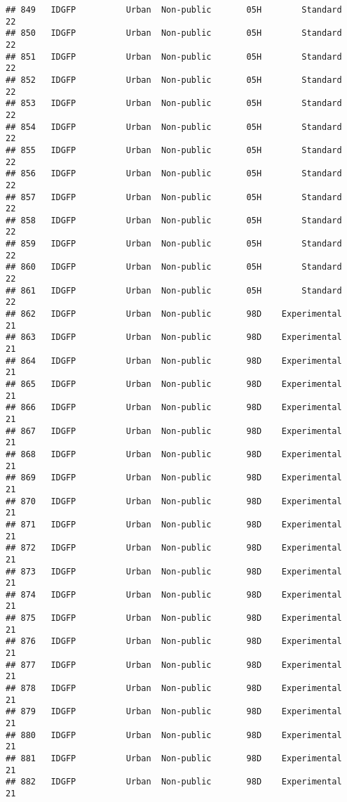 \documentclass[
]{article}
\begin{document}
\begin{verbatim}
## 849   IDGFP          Urban  Non-public       05H        Standard        22
## 850   IDGFP          Urban  Non-public       05H        Standard        22
## 851   IDGFP          Urban  Non-public       05H        Standard        22
## 852   IDGFP          Urban  Non-public       05H        Standard        22
## 853   IDGFP          Urban  Non-public       05H        Standard        22
## 854   IDGFP          Urban  Non-public       05H        Standard        22
## 855   IDGFP          Urban  Non-public       05H        Standard        22
## 856   IDGFP          Urban  Non-public       05H        Standard        22
## 857   IDGFP          Urban  Non-public       05H        Standard        22
## 858   IDGFP          Urban  Non-public       05H        Standard        22
## 859   IDGFP          Urban  Non-public       05H        Standard        22
## 860   IDGFP          Urban  Non-public       05H        Standard        22
## 861   IDGFP          Urban  Non-public       05H        Standard        22
## 862   IDGFP          Urban  Non-public       98D    Experimental        21
## 863   IDGFP          Urban  Non-public       98D    Experimental        21
## 864   IDGFP          Urban  Non-public       98D    Experimental        21
## 865   IDGFP          Urban  Non-public       98D    Experimental        21
## 866   IDGFP          Urban  Non-public       98D    Experimental        21
## 867   IDGFP          Urban  Non-public       98D    Experimental        21
## 868   IDGFP          Urban  Non-public       98D    Experimental        21
## 869   IDGFP          Urban  Non-public       98D    Experimental        21
## 870   IDGFP          Urban  Non-public       98D    Experimental        21
## 871   IDGFP          Urban  Non-public       98D    Experimental        21
## 872   IDGFP          Urban  Non-public       98D    Experimental        21
## 873   IDGFP          Urban  Non-public       98D    Experimental        21
## 874   IDGFP          Urban  Non-public       98D    Experimental        21
## 875   IDGFP          Urban  Non-public       98D    Experimental        21
## 876   IDGFP          Urban  Non-public       98D    Experimental        21
## 877   IDGFP          Urban  Non-public       98D    Experimental        21
## 878   IDGFP          Urban  Non-public       98D    Experimental        21
## 879   IDGFP          Urban  Non-public       98D    Experimental        21
## 880   IDGFP          Urban  Non-public       98D    Experimental        21
## 881   IDGFP          Urban  Non-public       98D    Experimental        21
## 882   IDGFP          Urban  Non-public       98D    Experimental        21

\end{verbatim}
\end{document}
